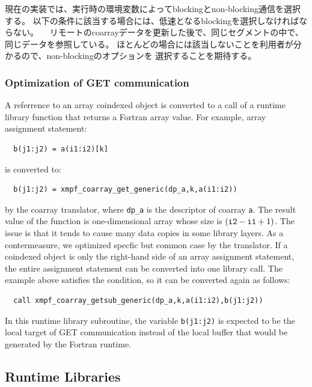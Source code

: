 現在の実装では、実行時の環境変数によってblockingとnon-blocking通信を選択する。
以下の条件に該当する場合には、低速となるblockingを選択しなければならない。
　リモートのcoarrayデータを更新した後で、同じセグメントの中で、同じデータを参照している。
ほとんどの場合には該当しないことを利用者が分かるので、non-blockingのオプションを
選択することを期待する。


\subsubsection{Optimization of GET communication}\label{sec:opt-get}

A referrence to an array coindexed object is converted to a call of a runtime library 
function that returns a Fortran array value. For example, array assignment statement:
\begin{verbatim}
  b(j1:j2) = a(i1:i2)[k] 
\end{verbatim}
is converted to:
\begin{verbatim}
  b(j1:j2) = xmpf_coarray_get_generic(dp_a,k,a(i1:i2)) 
\end{verbatim}
by the coarray translator, where {\tt dp\_a} is the descriptor of coarray {\tt a}.
The result value of the function is one-dimensional array whose size 
is $({\tt i2} - {\tt i1} + 1)$.
The issue is that it tends to cause many data copies in some library layers.
As a contermeasure, we optimized specfic but common case by the translator.
If a coindexed object is only the right-hand side of an array assignment statement,
the entire assignment statement can be converted into one library call.
The example above satisfies the condition, so it can be converted again as follows:
\begin{verbatim}
  call xmpf_coarray_getsub_generic(dp_a,k,a(i1:i2),b(j1:j2)) 
\end{verbatim}
In this runtime library subroutine, the variable {\tt b(j1:j2)} is expected to be 
the local target of GET communication instead of the local buffer that would be
generated by the Fortran runtime.


\subsection{Runtime Libraries}\label{sec:runtime}

